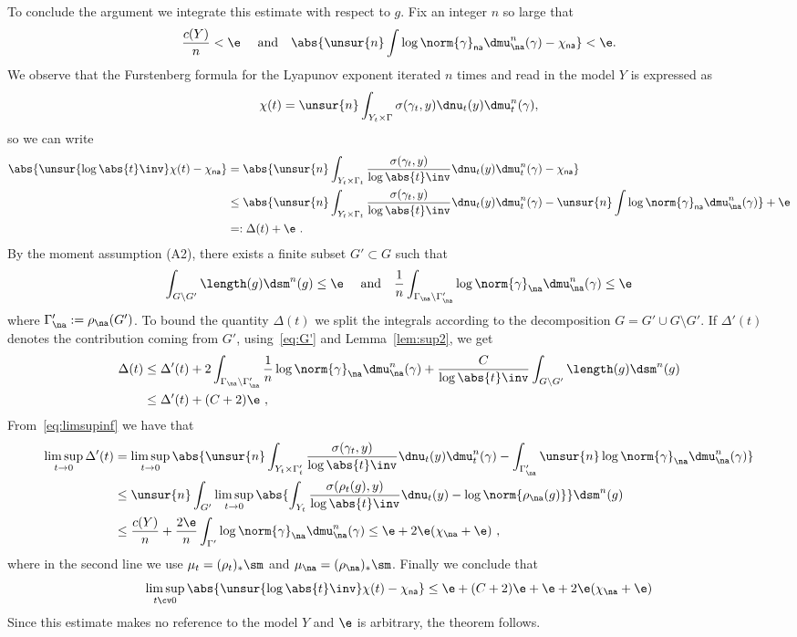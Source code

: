 To conclude the argument we integrate this estimate with respect to $g$. Fix an integer $n$ so large that
\[
\frac{c(Y)}{n} <\e \quad\text{ and}\quad \abs{\unsur{n} \int \log \norm{\gamma}_{\sf na} \dmu_\na^n(\gamma) - \chi_{\sf na}} <\e.
\]
We observe that the Furstenberg formula for the Lyapunov exponent iterated $n$ times and read in the model $Y$ is expressed as
\[
\chi(t) = \unsur{n} \int_{Y_t \times \Gamma} {\sigma(\gamma_t, y)} \dnu_t(y) \dmu_t^n(\gamma),
\]
so we can write
\begin{align*}
\abs{ \unsur{\log\abs{t }\inv} \chi(t) - \chi_{\sf na} } &= \abs{\unsur{n} \int_{Y_t \times \Gamma_t} \frac{\sigma(\gamma_t, y)}{{\log\abs{t }\inv}} \dnu_t(y) \dmu_t^n(\gamma) - \chi_{\sf na} }\\
&\leq \abs{\unsur{n} \int_{Y_t \times \Gamma_t} \frac{\sigma(\gamma_t, y)}{{\log\abs{t }\inv}} \dnu_t(y) \dmu_t^n(\gamma) - \unsur{n} \int \log \norm{\gamma}_{\sf na} \dmu_\na^n(\gamma) }+ \e \\
&=: \Delta(t) + \e~.
\end{align*}
By the moment assumption (A2), there exists a finite subset $G' \subset G$ such that
\begin{equation}\label{eq:G'}
\int_{G\setminus G'} \length(g) \dsm^n (g) \le \e \quad\text{ and}\quad
\frac1n \int_{\Gamma_\na \setminus \Gamma'_\na} \log\norm{\gamma}_\na \dmu_\na^n(\gamma) \le \e
\end{equation}
where $\Gamma'_\na := \rho_\na(G')$. To bound the quantity $\Delta(t)$ we split the integrals according to the decomposition $G = G'\cup G\setminus G'$. If $\Delta'(t)$ denotes the contribution coming from $G'$, using~\eqref{eq:G'} and Lemma~\ref{lem:sup2}, we get
\begin{align*}
\Delta(t) & \le \Delta'(t) + 2 \int_{\Gamma_\na \setminus \Gamma'_\na}\frac1n \log\norm{\gamma}_\na \dmu_\na^n(\gamma) + \frac{C}{\log \abs{ t}\inv }
\int_{G\setminus G'} \length(g) \dsm^n (g) \\
& \le \Delta'(t) + (C+2) \e~,
\end{align*}
From~\eqref{eq:limsupinf} we have that
\begin{align*}
\limsup_{t\to 0}\Delta'(t) &=
\limsup_{t\to 0}\abs{\unsur{n} \int_{Y_t \times \Gamma'_t} \frac{\sigma(\gamma_t, y)}{{\log\abs{t }\inv}} \dnu_t(y) \dmu_t^n(\gamma) -\int_{\Gamma' _\na} \unsur{n} \log\norm{\gamma}_\na \dmu_\na^n(\gamma) } \\
&\leq
\unsur{n} \int_{G'} \limsup_{t\to 0} \abs{ \int_{Y_t} \frac{\sigma(\rho_t(g), y)}{{\log\abs{t }\inv}} \dnu_t(y) - \log\norm{\rho_\na(g)} } \dsm^n(g)
\\
& \leq
\frac{c(Y)}n + \frac{ 2\e}{n} \int_{\Gamma'} \log \norm{\gamma}_\na \dmu_\na^n(\gamma)\leq \e + 2 \e (\chi_\na + \e)~,
\end{align*}
where in the second line we use $\mu_t = (\rho_t)_*\sm$ and $\mu_\na = (\rho_\na)_*\sm$. Finally we conclude that
\[
\limsup_{t\cv0} \abs{ \unsur{\log\abs{t }\inv} \chi(t) - \chi_{\sf na} } \leq \e + (C+2)\e + \e + 2 \e (\chi_\na + \e)
\]
Since this estimate makes no reference to the model $Y$ and $\e$ is arbitrary, the theorem follows.


